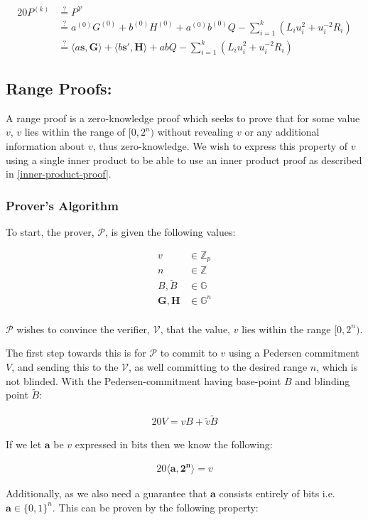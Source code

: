 \documentclass{article}
\newcommand{\eq}[1]{\begin{alignat*}{20}#1\end{alignat*}}
\newcommand{\eqn}[2]{\begin{equation}\label{#1}\begin{split}#2\end{split}\end{equation}}
\renewcommand{\vec}[1]{\boldsymbol{#1}}
\newcommand{\V}{\mathcal{V}}
\renewcommand{\P}{\mathcal{P}}
\newcommand{\G}{\mathbb{G}}
\newcommand{\Z}{\mathbb{Z}}
\newcommand{\dotp}[2]{\langle #1, #2 \rangle}
\newcommand{\blind}[1]{\widetilde{#1}}
\newcommand{\bv}{\blind{v}}
\newcommand{\bB}{\blind{B}}
\begin{document}
\eq{
	P^{(k)} &\stackrel{?}{=} P^{\V} \\
	        &\stackrel{?}{=} a^{(0)}G^{(0)} + b^{(0)}H^{(0)} + a^{(0)}b^{(0)}Q - \sum^k_{i=1} (L_i u^2_i + u^{-2}_i R_i) \\
	        &\stackrel{?}{=} \dotp{a\vec{s}}{\vec{G}} + \dotp{b\vec{s'}}{\vec{H}} + abQ - \sum^k_{i=1} (L_i u^2_i + u^{-2}_i R_i)
}

\subsection{Range Proofs:} \label{range-proofs}

A range proof is a zero-knowledge proof which seeks to prove that for
some value $v$, $v$ lies within the range of $[0,2^n)$ without revealing
$v$ or any additional information about $v$, thus zero-knowledge. We
wish to express this property of $v$ using a single inner product to be
able to use an inner product proof as described in \ref{inner-product-proof}.

\subsubsection{Prover's Algorithm}\label{prover-range-proofs}

To start, the prover, $\P$, is given the following values:

\eqn{def1}{
	v &\in \Z_p \\
	n &\in \Z\\
	B, \bB &\in \G\\
	\vec{G}, \vec{H} &\in \G^n \\
}

$\P$ wishes to convince the verifier, $\V$, that the value, $v$ lies
within the range $[0,2^n)$.

The first step towards this is for $\P$ to commit to $v$ using
a Pedersen commitment $V$, and sending this to the $\V$, as well
committing to the desired range $n$, which is not blinded. With the
Pedersen-commitment having base-point $B$ and blinding point $\bB$:

\eq{
	V = vB + \bv \bB
}

If we let $\vec{a}$ be $v$ expressed in bits then we know the following:

\eq{
	\dotp{\vec{a}}{\vec{2^n}} = v
}

Additionally, as we also need a guarantee that $\vec{a}$ consists
entirely of bits i.e. $\vec{a} \in \{0,1\}^n$. This can be
proven by the following property:
\end{document}
